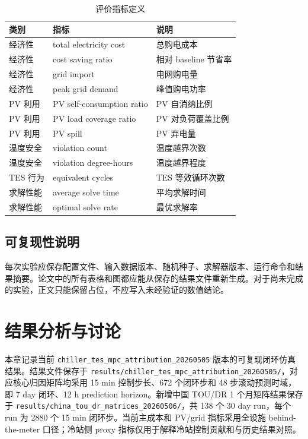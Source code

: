\documentclass[UTF8,a4paper,12pt]{ctexrep}
\begin{document}
\begin{table}[htbp]
  \centering
  \caption{评价指标定义}
  \begin{tabular}{lll}
    \toprule
    类别 & 指标 & 说明 \\
    \midrule
    经济性 & total electricity cost & 总购电成本 \\
    经济性 & cost saving ratio & 相对 baseline 节省率 \\
    经济性 & grid import & 电网购电量 \\
    经济性 & peak grid demand & 峰值购电功率 \\
    PV 利用 & PV self-consumption ratio & PV 自消纳比例 \\
    PV 利用 & PV load coverage ratio & PV 对负荷覆盖比例 \\
    PV 利用 & PV spill & PV 弃电量 \\
    温度安全 & violation count & 温度越界次数 \\
    温度安全 & violation degree-hours & 温度越界程度 \\
    TES 行为 & equivalent cycles & TES 等效循环次数 \\
    求解性能 & average solve time & 平均求解时间 \\
    求解性能 & optimal solve rate & 最优求解率 \\
    \bottomrule
  \end{tabular}
\end{table}

\section{可复现性说明}

每次实验应保存配置文件、输入数据版本、随机种子、求解器版本、运行命令和结果摘要。论文中的所有表格和图都应能从保存的结果文件重新生成。对于尚未完成的实验，正文只能保留占位，不应写入未经验证的数值结论。

\chapter{结果分析与讨论}

本章记录当前 \texttt{chiller\_tes\_mpc\_attribution\_20260505} 版本的可复现闭环仿真结果。结果文件保存于 \texttt{results/chiller\_tes\_mpc\_attribution\_20260505/}，对应核心归因矩阵均采用 15 min 控制步长、672 个闭环步和 48 步滚动预测时域，即 7 day 闭环、12 h prediction horizon。新增中国 TOU/DR 1 个月矩阵结果保存于 \texttt{results/china\_tou\_dr\_matrices\_20260506/}，共 138 个 30 day run，每个 run 为 2880 个 15 min 闭环步。当前主成本和 PV/grid 指标采用全设施 behind-the-meter 口径；冷站侧 proxy 指标仅用于解释冷站控制贡献和与历史结果对照。
\end{document}
